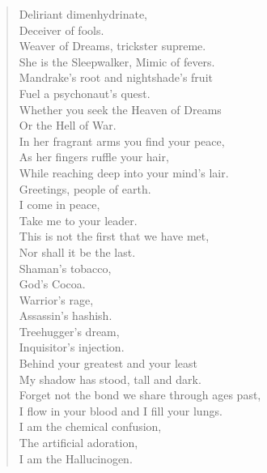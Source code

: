 \documentclass[11pt,letterpaper]{article}
\begin{document}
\begin{verse}
Deliriant dimenhydrinate,\\
Deceiver of fools.\\
Weaver of Dreams, trickster supreme.\\
She is the Sleepwalker, Mimic of fevers.\\
Mandrake's root and nightshade's fruit\\
Fuel a psychonaut's quest.\\
Whether you seek the Heaven of Dreams\\
Or the Hell of War.\\
In her fragrant arms you find your peace,\\
As her fingers ruffle your hair,\\
While reaching deep into your mind's lair.\\

Greetings, people of earth.\\
I come in peace,\\
Take me to your leader.\\
This is not the first that we have met,\\
Nor shall it be the last.\\
Shaman's tobacco,\\
God's Cocoa.\\
Warrior's rage,\\
Assassin's hashish.\\
Treehugger's dream,\\
Inquisitor's injection.\\
Behind your greatest and your least\\
My shadow has stood, tall and dark.\\
Forget not the bond we share through ages past,\\
I flow in your blood and I fill your lungs.\\
I am the chemical confusion,\\
The artificial adoration,\\
I am the Hallucinogen.\\

\end{verse}

\end{document}
